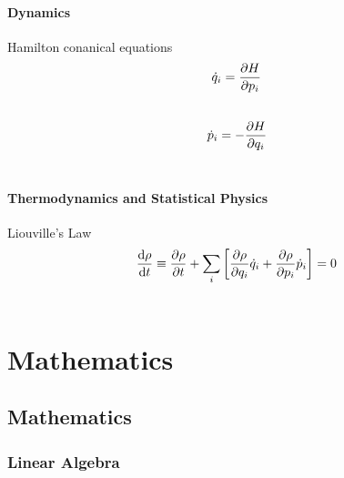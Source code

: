 \documentclass[letterpaper,10pt,english]{sphinxmanual}
\begin{document}
\subsubsection{Dynamics}
\label{Basic:dynamics}
Hamilton conanical equations
\begin{gather}
\begin{split}\dot q_i = \frac{\partial H}{\partial p_i}\end{split}\notag\\\begin{split}\end{split}\notag
\end{gather}\begin{gather}
\begin{split}\dot p_i = - \frac{\partial H}{\partial q_i}\end{split}\notag\\\begin{split}\end{split}\notag
\end{gather}

\subsubsection{Thermodynamics and Statistical Physics}
\label{Basic:thermodynamics-and-statistical-physics}
Liouville's Law
\begin{gather}
\begin{split}\frac{\mathrm d \rho}{\mathrm d t}\equiv \frac{\partial \rho}{\partial t} + \sum_i \left[ \frac{\partial \rho}{\partial q_i}\dot q_i + \frac{\partial \rho}{\partial p_i}\dot p_i \right] = 0\end{split}\notag\\\begin{split}\end{split}\notag
\end{gather}

\chapter{Mathematics}
\label{index:mathematics}

\section{Mathematics}
\label{math:mathematics}\label{math::doc}

\subsection{Linear Algebra}
\label{math:linear-algebra}
\end{document}
